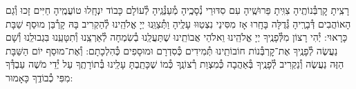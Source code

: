 \documentclass[twoside, openany, parskip=half, 11pt]{book}
\begin{document}
%
%
%
%
%
%



\sepline


רָצִֽיתָ קׇרְבְּ֯נוֹתֶֽיהָ צִוִּֽיתָ פֵּרוּשֶֽׁיהָ עִם סִדּוּרֵי נְ֯סָכֶֽיהָ מְ֯עַנְּ֯גֶֽיהָ לְ֯עוֹלָם כָּבוֹד יִנְחָֽלוּ טוֹעֲמֶֽיהָ חַיִּים זָכוּ וְ֯גַם הָאוֹהֲבִים דְּ֯בָרֶֽיהָ גְּ֯דֻלָּה בָּחָֽרוּ אָז מִסִּינַי נִצְטַוּוּ עָלֶֽיהָ
וַתְּ֯צַוֵּֽנוּ יְיָ אֱלֹהֵֽינוּ לְ֯הַקְרִיב בָּהּ קָרְ֯בַּן מוּסַף שַׁבָּת כָּרָאוּי: יְ֯הִי רָצוֹן מִלְּ֯פָנֶֽיךָ יְיָ אֱלֹהֵֽינוּ וֵאלֹהֵי אֲבוֹתֵֽינוּ שֶׁתַּעֲלֵֽנוּ בְ֯שִׂמְחָה לְ֯אַרְצֵֽנוּ וְ֯תִטָּעֵֽנוּ בִּגְבוּלֵֽנוּ וְ֯שָׁם נַעֲשֶׂה לְ֯פָנֶֽיךָ אֶת־קׇרְבְּ֯נוֹת חוֹבוֹתֵֽינוּ תְּ֯מִידִים כְּ֯סִדְרָם וּמוּסָפִים כְּ֯הִלְכָתָם: וְ֯אֶת־מוּסַף יוֹם הַשַּׁבָּת הַזֶּה נַעֲשֶׂה וְ֯נַקְרִיב לְ֯פָנֶֽיךָ בְּ֯אַהֲבָה כְּ֯מִצְוַת רְ֯צוֹנֶֽךָ כְּ֯מוֹ שֶׁכָּתַֽבְתָּ עָלֵֽינוּ בְּ֯תוֹרָתֶֽךָ עַל יְ֯דֵי מֹשֶׁה עַבְדְּ֯ךָ מִפִּי כְ֯בוֹדֶֽךָ כָּאָמוּר:
\end{document}
